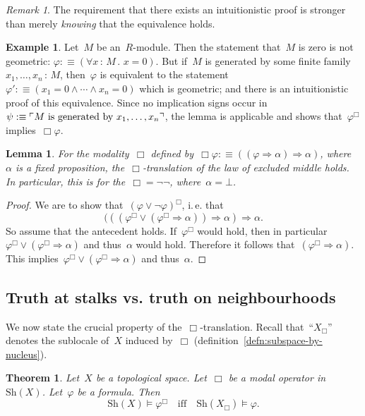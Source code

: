\documentclass[10pt]{amsart}
\makeatletter
\theoremstyle{definition}
\newtheorem{ex}[defn]{Example}
\theoremstyle{plain}
\newtheorem{lemma}[defn]{Lemma}
\newtheorem{thm}[defn]{Theorem}
\theoremstyle{remark}
\newtheorem{rem}[defn]{Remark}
\newcommand{\Sh}{\mathrm{Sh}}
\newcommand{\?}{\,{:}\,}
\renewcommand{\_}{\mathpunct{.}\,}
\newcommand{\speak}[1]{\ulcorner\text{\textnormal{#1}}\urcorner}
\newcommand{\ie}{i.\,e.\@\xspace}
\makeatother
\begin{document}
\begin{rem}The requirement that there exists an intuitionistic proof is
stronger than merely \emph{knowing} that the equivalence holds.
\end{rem}


\begin{ex}\label{ex:module-zero-geometric}
Let~$M$ be an~$R$-module. Then the statement that~$M$ is zero is not
geometric: $\varphi :\equiv (\forall x\?M\_ x = 0)$. But if~$M$ is generated by some finite
family~$x_1,\ldots,x_n\?M$, then~$\varphi$ is equivalent to the
statement~$\varphi' :\equiv (x_1 = 0
\wedge \cdots \wedge x_n = 0)$ which is geometric; and there is an
intuitionistic proof of this equivalence. Since no implication signs occur
in~$\psi :\equiv \speak{$M$ is generated by~$x_1,\ldots,x_n$}$, the lemma is
applicable and shows that~$\varphi^\Box$ implies~$\Box\varphi$.\end{ex}

\begin{lemma}For the modality~$\Box$ defined by~$\Box\varphi :\equiv ((\varphi
\Rightarrow \alpha) \Rightarrow \alpha)$, where~$\alpha$ is a fixed
proposition, the~$\Box$-translation of the law of excluded middle holds.
In particular, this is for the~$\Box = \neg\neg$, where~$\alpha =
\bot$.\end{lemma}
\begin{proof}We are to show that~$(\varphi \vee \neg\varphi)^\Box$, \ie that
\[ (((\varphi^\Box \vee (\varphi^\Box \Rightarrow \alpha)) \Longrightarrow
\alpha) \Longrightarrow \alpha. \]
So assume that the antecedent holds. If~$\varphi^\Box$ would hold, then in
particular~$\varphi^\Box \vee (\varphi^\Box \Rightarrow \alpha)$ and thus~$\alpha$
would hold. Therefore it follows that~$(\varphi^\Box \Rightarrow \alpha)$. This
implies~$\varphi^\Box \vee (\varphi^\Box \Rightarrow \alpha)$ and
thus~$\alpha$.
\end{proof}


\subsection{Truth at stalks vs. truth on neighbourhoods}\label{sect:spreading}
We now state the crucial property of the~$\Box$-translation. Recall
that~``$X_\Box$'' denotes the sublocale of~$X$ induced by~$\Box$
(definition~\ref{defn:subspace-by-nucleus}).
\begin{thm}\label{thm:box-translation-semantically}
Let~$X$ be a topological space. Let~$\Box$ be a modal operator
in~$\Sh(X)$. Let~$\varphi$ be a formula. Then
\[ \Sh(X) \models \varphi^\Box \quad\text{iff}\quad
  \Sh(X_\Box) \models \varphi. \]
\end{thm}
\end{document}
